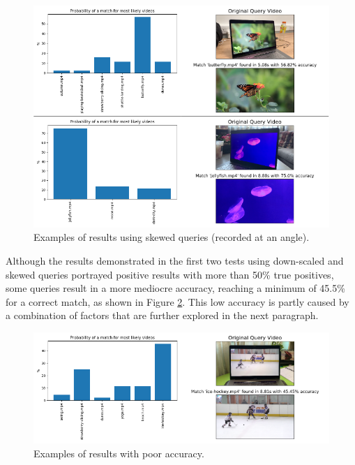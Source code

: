 \begin{figure}[h] 
\centerline{\includegraphics[width=\textwidth]{figures/evaluation/skewed-queries.png}}
\caption{\label{fig:evaluation-skewed-queries}Examples of results using skewed queries (recorded at an angle).}
\end{figure}

Although the results demonstrated in the first two tests using down-scaled and skewed queries portrayed positive results with more than 50\% true positives, some queries result in a more mediocre accuracy, reaching a minimum of 45.5\% for a correct match, as shown in Figure \ref{fig:evaluation-poor-accuracy-query}. This low accuracy is partly caused by a combination of factors that are further explored in the next paragraph. %

\begin{figure}[h] 
\centerline{\includegraphics[width=\textwidth]{figures/evaluation/poor-accuracy-query.png}}
\caption{\label{fig:evaluation-poor-accuracy-query}Examples of results with poor accuracy.}
\end{figure}

